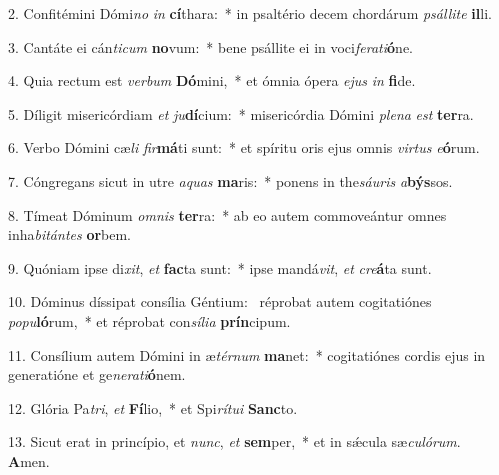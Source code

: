2. Confitémini Dómi\textit{no} \textit{in} \textbf{cí}thara:~*  in psaltério decem chordárum \textit{psál}\textit{li}\textit{te} \textbf{il}li.\

3. Cantáte ei cán\textit{ti}\textit{cum} \textbf{no}vum:~*  bene psállite ei in voci\textit{fe}\textit{ra}\textit{ti}\textbf{ó}ne.\

4. Quia rectum est \textit{ver}\textit{bum} \textbf{Dó}mini,~*  et ómnia ópera \textit{e}\textit{jus} \textit{in} \textbf{fi}de.\

5. Díligit misericórdiam \textit{et} \textit{ju}\textbf{dí}cium:~*  misericórdia Dómini \textit{ple}\textit{na} \textit{est} \textbf{ter}ra.\

6. Verbo Dómini cæ\textit{li} \textit{fir}\textbf{má}ti sunt:~*  et spíritu oris ejus omnis \textit{vir}\textit{tus} \textit{e}\textbf{ó}rum.\

7. Cóngregans sicut in utre \textit{a}\textit{quas} \textbf{ma}ris:~*  ponens in the\textit{sáu}\textit{ris} \textit{a}\textbf{býs}sos.\

8. Tímeat Dóminum \textit{om}\textit{nis} \textbf{ter}ra:~*  ab eo autem commoveántur omnes inha\textit{bi}\textit{tán}\textit{tes} \textbf{or}bem.\

9. Quóniam ipse di\textit{xit}, \textit{et} \textbf{fac}ta sunt:~*  ipse mandá\textit{vit}, \textit{et} \textit{cre}\textbf{á}ta sunt.\

10. Dóminus díssipat consília Géntium: \dag\  réprobat autem cogitatiónes \textit{po}\textit{pu}\textbf{ló}rum,~*  et réprobat con\textit{sí}\textit{li}\textit{a} \textbf{prín}cipum.\

11. Consílium autem Dómini in æ\textit{tér}\textit{num} \textbf{ma}net:~*  cogitatiónes cordis ejus in generatióne et ge\textit{ne}\textit{ra}\textit{ti}\textbf{ó}nem.\

12. Glória Pa\textit{tri}, \textit{et} \textbf{Fí}lio,~*  et Spi\textit{rí}\textit{tu}\textit{i} \textbf{Sanc}to.\

13. Sicut erat in princípio, et \textit{nunc}, \textit{et} \textbf{sem}per,~*  et in sǽcula sæ\textit{cu}\textit{ló}\textit{rum}. \textbf{A}men.\

